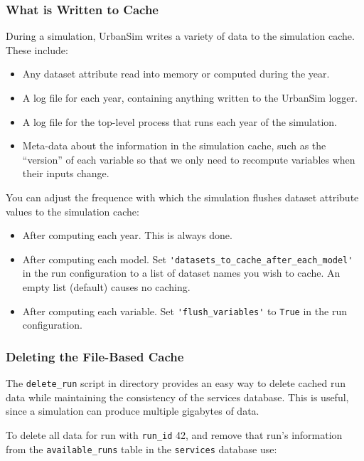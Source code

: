 \subsubsection{What is Written to Cache}
During a simulation, UrbanSim writes a variety of data to the simulation
cache. \simulationcacheindex These include:
\begin{itemize}
  \item Any dataset \datasetindex attribute read into memory or computed during the year.
  \item A log file for each year, containing anything written to the UrbanSim
  logger.
  \item A log file for the top-level process that runs each year of the
  simulation.
  \item Meta-data about the information in the simulation
  cache, \simulationcacheindex such as the ``version'' of each variable so that
  we only need to recompute variables \variablesindex when their inputs change.
\end{itemize}

You can adjust the frequence with which the simulation flushes dataset \datasetindex
attribute \attributesindex values to the simulation cache: \simulationcacheindex

\begin{itemize}
  \item After computing each year.  This is always done.
  \item After computing each model.  Set
  \verb|'datasets_to_cache_after_each_model'| in the run configuration to
  a list of dataset \datasetindex names you wish to cache. An empty list (default) causes
  no caching.
  \item After computing each variable. \variablesindex Set \verb|'flush_variables'| \variablesindex to \verb|True| in the
  run configuration.
\end{itemize}

\subsubsection{Deleting the File-Based Cache}

The \verb|delete_run| script in  directory
provides an easy way to delete cached run data while maintaining the
consistency of the services database.  This is useful, since a simulation can
produce multiple gigabytes of data.

To delete all data for run with \verb|run_id| 42, and remove that run's
information from the \verb|available_runs| table in the \verb|services|
database use:

